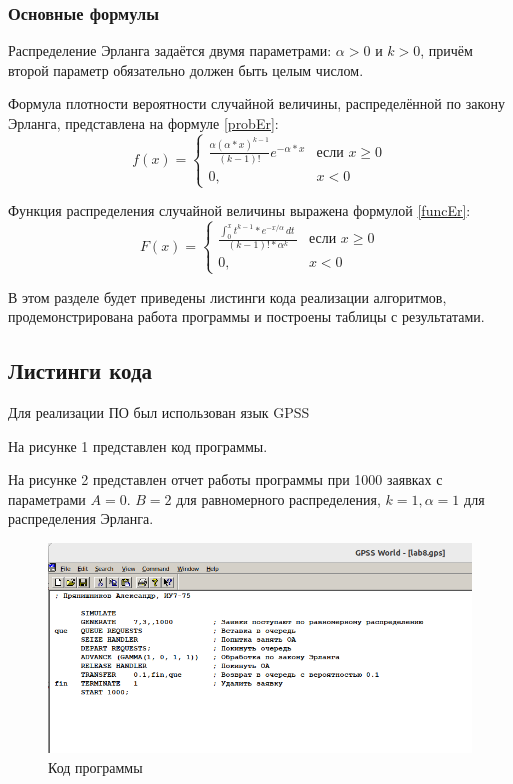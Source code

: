 \subsubsection*{Основные формулы}
Распределение Эрланга задаётся двумя параметрами: $\alpha > 0$ и $k > 0$, причём второй параметр обязательно должен быть целым числом. 

Формула плотности вероятности случайной величины, распределённой по закону Эрланга, представлена на формуле \ref{probEr}:
\begin{equation}
	\label{probEr}
	f(x)= 
	\begin{cases}
		\frac{\alpha  (\alpha*x)^{k - 1}} {(k - 1)!}e^{-\alpha*x} & \text{если } x \geq 0 \\
		0,              & x < 0
	\end{cases}
\end{equation}

Функция распределения случайной величины выражена формулой \ref{funcEr}:
\begin{equation}
	\label{funcEr}
	F(x)= 
	\begin{cases}
		\frac{\int_{0}^{x} t^{k-1}*e^{-x/\alpha} \,dt \ } {(k - 1)!*\alpha^k} & \text{если } x \geq 0 \\
		0,              & x < 0
	\end{cases}
\end{equation}

\newpage

В этом разделе будет приведены листинги кода реализации алгоритмов, продемонстрирована работа программы и построены таблицы с результатами.

\subsection*{Листинги кода}
Для реализации ПО был использован язык GPSS

На рисунке 1 представлен код программы.

На рисунке 2 представлен отчет работы программы при 1000 заявках с параметрами $A=0$. $B=2$ для равномерного распределения,
$k=1, \alpha=1$ для распределения Эрланга. 

\FloatBarrier
\begin{figure}[h]	
	\begin{center}
		\includegraphics[width=\linewidth]{inc/png/code.png}
	\end{center}
	\captionsetup{justification=centering}
	\caption{Код программы}
\end{figure}
\FloatBarrier


